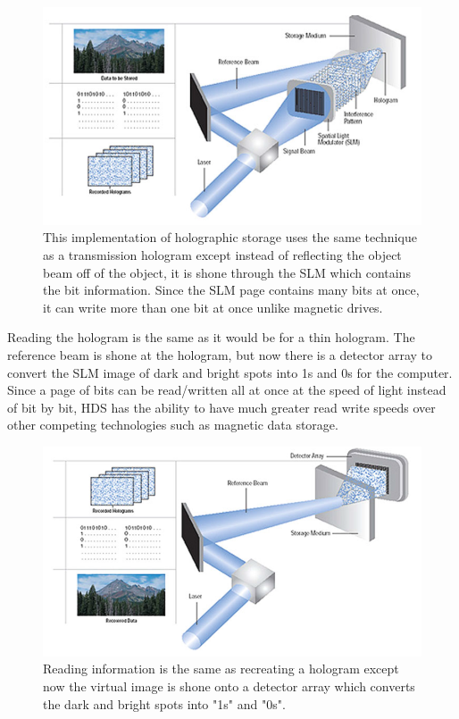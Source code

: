 \documentclass[ notitlepage, numerical, 11pt]{revtex4-1} %
\begin{document}
\begin{figure}[H]
\centerline{\includegraphics[scale=.45]{dataHologramCreate.png}}
\caption{This implementation of holographic storage uses the same technique as a transmission hologram except instead of reflecting the object beam off of the object, it is shone through the SLM which contains the bit information. Since the SLM page contains many bits at once, it can write more than one bit at once unlike magnetic drives.}
\label{dataHologramCreate}
\end{figure} 
Reading the hologram is the same as it would be for a thin hologram. The reference beam is shone at the hologram, but now there is a detector array to convert the SLM image of dark and bright spots into 1s and 0s for the computer. Since a page of bits can be read/written all at once at the speed of light instead of bit by bit, HDS has the ability to have much greater read write speeds over other competing technologies such as magnetic data storage.
\begin{figure}[H]
\centerline{\includegraphics[scale=.45]{dataHologramReconstruct.png}}
\caption{Reading information is the same as recreating a hologram except now the virtual image is shone onto a detector array which converts the dark and bright spots into "1s" and "0s".}
\label{dataHologramReconstruct}
\end{figure} 
\end{document}
